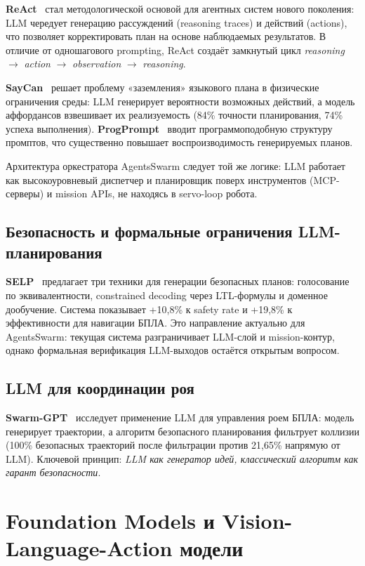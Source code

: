 \documentclass[14pt,a4paper]{extreport}
\begin{document}
\textbf{ReAct}~\cite{yao2023react} стал методологической основой для агентных систем нового поколения: LLM чередует генерацию рассуждений (reasoning traces) и действий (actions), что позволяет корректировать план на основе наблюдаемых результатов. В отличие от одношагового prompting, ReAct создаёт замкнутый цикл \textit{reasoning} $\to$ \textit{action} $\to$ \textit{observation} $\to$ \textit{reasoning}.

\textbf{SayCan}~\cite{ahn2022saycan} решает проблему «заземления» языкового плана в физические ограничения среды: LLM генерирует вероятности возможных действий, а модель аффордансов взвешивает их реализуемость (84\% точности планирования, 74\% успеха выполнения). \textbf{ProgPrompt}~\cite{singh2023progprompt} вводит программоподобную структуру промптов, что существенно повышает воспроизводимость генерируемых планов.

Архитектура оркестратора AgentsSwarm следует той же логике: LLM работает как высокоуровневый диспетчер и планировщик поверх инструментов (MCP-серверы) и mission APIs, не находясь в servo-loop робота.

\subsection{Безопасность и формальные ограничения LLM-планирования}

\textbf{SELP}~\cite{pan2025selp} предлагает три техники для генерации безопасных планов: голосование по эквивалентности, constrained decoding через LTL-формулы и доменное дообучение. Система показывает +10{,}8\% к safety rate и +19{,}8\% к эффективности для навигации БПЛА. Это направление актуально для AgentsSwarm: текущая система разграничивает LLM-слой и mission-контур, однако формальная верификация LLM-выходов остаётся открытым вопросом.

\subsection{LLM для координации роя}

\textbf{Swarm-GPT}~\cite{jiao2023swarmgpt} исследует применение LLM для управления роем БПЛА: модель генерирует траектории, а алгоритм безопасного планирования фильтрует коллизии (100\% безопасных траекторий после фильтрации против 21{,}65\% напрямую от LLM). Ключевой принцип: \textit{LLM как генератор идей, классический алгоритм как гарант безопасности}.

\section{Foundation Models и Vision-Language-Action модели}
\end{document}
